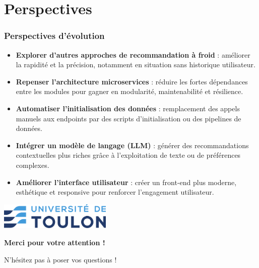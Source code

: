 \documentclass{beamer}
\begin{document}
    \section{Perspectives}
    \begin{frame}
        \frametitle{Perspectives d'évolution}
        \small
        \begin{itemize}
            \item \textbf{Explorer d'autres approches de recommandation à froid} :
            améliorer la rapidité et la précision, notamment en situation sans historique utilisateur.

            \item \textbf{Repenser l'architecture microservices} :
            réduire les fortes dépendances entre les modules pour gagner en modularité, maintenabilité et résilience.

            \item \textbf{Automatiser l’initialisation des données} :
            remplacement des appels manuels aux endpoints par des scripts d’initialisation ou des pipelines de données.

            \item \textbf{Intégrer un modèle de langage (LLM)} :
            générer des recommandations contextuelles plus riches grâce à l’exploitation de texte ou de préférences complexes.

            \item \textbf{Améliorer l’interface utilisateur} :
            créer un front-end plus moderne, esthétique et responsive pour renforcer l’engagement utilisateur.
        \end{itemize}
    \end{frame}



    \begin{frame}[c]
        \centering
        \includegraphics[width=0.4\textwidth]{logo.png}

        \vspace{1cm}
        {\Huge \textbf{Merci pour votre attention !}}

        \vspace{1.5cm}
        {\Large N'hésitez pas à poser vos questions !}
    \end{frame}
\end{document}
